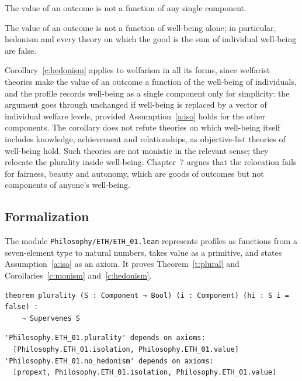 \documentclass{situationist-preprint}
\begin{document}
\begin{corollary}\label{c:monism}
The value of an outcome is not a function of any single component.
\end{corollary}

\begin{corollary}\label{c:hedonism}
The value of an outcome is not a function of well-being alone; in particular, hedonism and every theory on which the good is the sum of individual well-being are false.
\end{corollary}

Corollary~\ref{c:hedonism} applies to welfarism in all its forms, since welfarist theories make the value of an outcome a function of the well-being of individuals, and the profile records well-being as a single component only for simplicity: the argument goes through unchanged if well-being is replaced by a vector of individual welfare levels, provided Assumption~\ref{a:iso} holds for the other components. The corollary does not refute theories on which well-being itself includes knowledge, achievement and relationships, as objective-list theories of well-being hold. Such theories are not monistic in the relevant sense; they relocate the plurality inside well-being. Chapter~7 argues that the relocation fails for fairness, beauty and autonomy, which are goods of outcomes but not components of anyone's well-being.

\subsection*{Formalization}

The module \nolinkurl{Philosophy/ETH/ETH_01.lean} represents profiles as functions from a seven-element type to natural numbers, takes value as a primitive, and states Assumption~\ref{a:iso} as an axiom. It proves Theorem~\ref{t:plural} and Corollaries~\ref{c:monism} and~\ref{c:hedonism}.

\begin{lstlisting}
theorem plurality (S : Component → Bool) (i : Component) (hi : S i = false) :
    ¬ Supervenes S
\end{lstlisting}

\begin{lstlisting}
'Philosophy.ETH_01.plurality' depends on axioms:
  [Philosophy.ETH_01.isolation, Philosophy.ETH_01.value]
'Philosophy.ETH_01.no_hedonism' depends on axioms:
  [propext, Philosophy.ETH_01.isolation, Philosophy.ETH_01.value]
\end{lstlisting}
\end{document}
